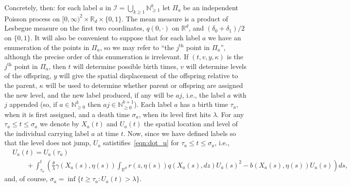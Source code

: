 \documentclass[12pt]{article}
\newcommand{\IR}{\mathbb R}
\newcommand{\IN}{\mathbb N}
\newcommand{\labelspace}{\mathcal{I}} %
\begin{document}
Concretely, then: for each label $a$ in
$\labelspace = \bigcup_{k \ge 1} \IN_{\ge 1}^k$
let $\Pi_a$ be an independent Poisson process on $[0, \infty)^2 \times \IR_d \times \{0,1\}$.
The mean measure is a product of Lesbegue measure on the first two coordinates,
$q(0, \cdot)$ on $\IR^d$, and $(\delta_0 + \delta_1)/2$ on $\{0, 1\}$.
It will also be convenient
to suppose that for each label $a$ we have an enumeration of the points in $\Pi_a$,
so we may refer to ``the $j^\text{th}$ point in $\Pi_a$'',
although the precise order of this enumeration is irrelevant.
If $(t, v, y, \kappa)$ is the $j^\text{th}$ point in $\Pi_a$,
then $t$ will determine possible birth times,
$v$ will determine levels of the offspring,
$y$ will give the spatial displacement of the offspring relative to the parent,
$\kappa$ will be used to determine whether parent or offspring are assigned the new level,
and the new label produced, if any will be $aj$,
i.e., the label $a$ with $j$ appended (so, if $a \in \IN_{\ge 0}^k$ then $aj \in \IN_{\ge 0}^{k+1}$).
Each label $a$ has a birth time $\tau_a$,
when it is first assigned,
and a death time $\sigma_a$, when its level first hits $\lambda$.
For any $\tau_a \le t \le \sigma_a$ we denote by $X_a(t)$ and $U_a(t)$ the spatial location and level
of the individual carrying label $a$ at time $t$.
Now, since we have defined labels so that the level does not jump,
$U_a$ satistifies~\eqref{eqn:dot_u} for $\tau_a \le t \le \sigma_a$, i.e.,
\begin{equation} \label{eqn:U_line_of_descent}
    \begin{split}
& U_a(t)
    =
    U_a(\tau_a) \\
&\qquad {}   
    + \int_{\tau_a}^{t}
    \left(
        \frac{\theta}{\lambda} \gamma(X_a(s),\eta(s))
        \int_{\IR^d} r(z,\eta(s)) q(X_a(s),dz) U_a(s)^2
        -
        b(X_a(s),\eta(s)) U_a(s)
    \right)
    ds ,
\end{split}
\end{equation}
and, of course, $\sigma_a = \inf\{t \ge \tau_a : U_a(t) > \lambda\}$.
\end{document}
